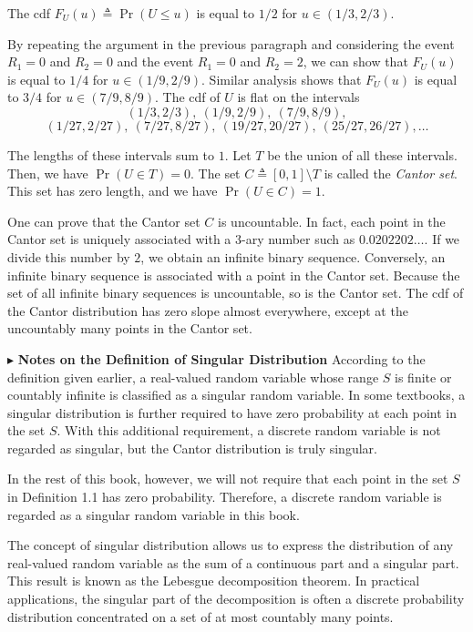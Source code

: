 The cdf $F_U(u)\triangleq \Pr(U\le u)$ is equal to $1/2$ for $u\in (1/3,2/3)$.

By repeating the argument in the previous paragraph and considering the event $R_1=0$ and $R_2=0$ and the event $R_1=0$ and $R_2=2$, we can show that $F_U(u)$ is equal to $1/4$ for $u\in (1/9,2/9)$. Similar analysis shows that $F_U(u)$ is equal to $3/4$ for $u\in (7/9,8/9)$. The cdf of $U$ is flat on the intervals
\[
(1/3,2/3),\ (1/9,2/9),\ (7/9,8/9),
\]
\[
(1/27,2/27),\ (7/27,8/27),\ (19/27,20/27),\ (25/27,26/27),\ldots
\]

The lengths of these intervals sum to $1$. Let $T$ be the union of all these intervals. Then, we have $\Pr(U\in T)=0$. The set $C\triangleq [0,1]\setminus T$ is called the \textit{Cantor set}. This set has zero length, and we have $\Pr(U\in C)=1$.

One can prove that the Cantor set $C$ is uncountable. In fact, each point in the Cantor set is uniquely associated with a $3$-ary number such as $0.0202202\ldots$. If we divide this number by $2$, we obtain an infinite binary sequence. Conversely, an infinite binary sequence is associated with a point in the Cantor set. Because the set of all infinite binary sequences is uncountable, so is the Cantor set. The cdf of the Cantor distribution has zero slope almost everywhere, except at the uncountably many points in the Cantor set.

\noindent$\blacktriangleright$ \textbf{Notes on the Definition of Singular Distribution} According to the definition given earlier, a real-valued random variable whose range $S$ is finite or countably infinite is classified as a singular random variable. In some textbooks, a singular distribution is further required to have zero probability at each point in the set $S$. With this additional requirement, a discrete random variable is not regarded as singular, but the Cantor distribution is truly singular.

In the rest of this book, however, we will not require that each point in the set $S$ in Definition 1.1 has zero probability. Therefore, a discrete random variable is regarded as a singular random variable in this book.

The concept of singular distribution allows us to express the distribution of any real-valued random variable as the sum of a continuous part and a singular part. This result is known as the Lebesgue decomposition theorem. In practical applications, the singular part of the decomposition is often a discrete probability distribution concentrated on a set of at most countably many points.

